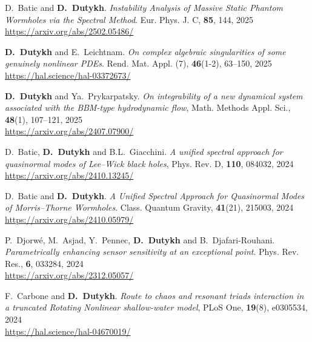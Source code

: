 \begin{etaremune}
  \item D.~Batic and \textbf{D.~Dutykh}. \textit{Instability Analysis of Massive Static Phantom Wormholes via the Spectral Method}. Eur. Phys. J. C, \textbf{85}, 144, 2025 \\ %
  \url{https://arxiv.org/abs/2502.05486/}

  \item \textbf{D.~Dutykh} and E.~Leichtnam. \textit{On complex algebraic singularities of some genuinely nonlinear PDEs}. Rend. Mat. Appl. (7), \textbf{46}(1-2), 63--150, 2025 \\ %
  \url{https://hal.science/hal-03372673/}

  \item \textbf{D.~Dutykh} and Ya.~Prykarpatsky. \textit{On integrability of a new dynamical system associated with the BBM-type hydrodynamic flow}, Math. Methods Appl. Sci., \textbf{48}(1), 107--121, 2025 \\ %
  \url{https://arxiv.org/abs/2407.07900/}



  \item D.~Batic, \textbf{D.~Dutykh} and B.L.~Giacchini. \textit{A unified spectral approach for quasinormal modes of Lee--Wick black holes}, Phys. Rev. D, \textbf{110}, 084032, 2024 \\ %
  \url{https://arxiv.org/abs/2410.13245/}

  \item D.~Batic and \textbf{D.~Dutykh}. \textit{A Unified Spectral Approach for Quasinormal Modes of Morris--Thorne Wormholes}. Class. Quantum Gravity, \textbf{41}(21), 215003, 2024 \\ %
  \url{https://arxiv.org/abs/2410.05979/}

  \item P.~Djorw\'e, M.~Asjad, Y.~Pennec, \textbf{D.~Dutykh} and B.~Djafari-Rouhani. \textit{Parametrically enhancing sensor sensitivity at an exceptional point}. Phys. Rev. Res., \textbf{6}, 033284, 2024 \\ %
  \url{https://arxiv.org/abs/2312.05057/}
  
  \item F.~Carbone and \textbf{D.~Dutykh}. \textit{Route to chaos and resonant triads interaction in a truncated Rotating Nonlinear shallow-water model}, PLoS One, \textbf{19}(8), e0305534, 2024 \\ %
  \url{https://hal.science/hal-04670019/}


\end{etaremune}

